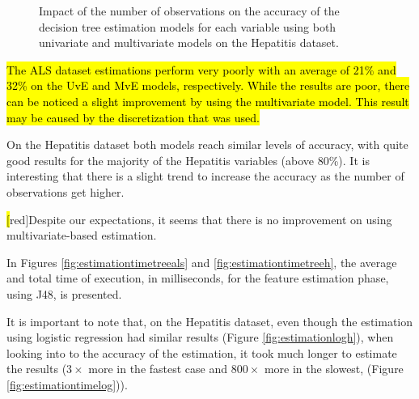 \begin{figure}[h]
  \begin{subfigmatrix}{2}
  \end{subfigmatrix}
  \caption{Impact of the number of observations on the accuracy of the decision tree estimation models for each variable using both univariate and multivariate models on the Hepatitis dataset.}
  \label{fig:estimationtreeh}
\end{figure}
 
\hl{The ALS dataset estimations perform very poorly with an average of 21\% and 32\% on the UvE and MvE models, respectively. While the results are poor, there can be noticed a slight improvement by using the multivariate model. This result may be caused by the discretization that was used. }
 
On the Hepatitis dataset both models reach similar levels of accuracy, with quite good results for the majority of the Hepatitis variables
 (above 80\%). It is interesting that there is a slight trend to increase the accuracy as the number of observations get higher.

\hl[red]{Despite our expectations, it seems that there is no improvement on using multivariate-based estimation.}

In Figures \ref{fig:estimationtimetreeals} and \ref{fig:estimationtimetreeh}, the average and total time of execution, in milliseconds, for the feature estimation phase, using J48, is presented.

It is important to note that, on the Hepatitis dataset, even though the estimation using logistic regression had similar results (Figure \ref{fig:estimationlogh}), when looking into to the accuracy of the estimation, it took much longer to estimate the results
 ($3\times$ more in the fastest case and $800\times$ more in the slowest, (Figure \ref{fig:estimationtimelog})).
 
